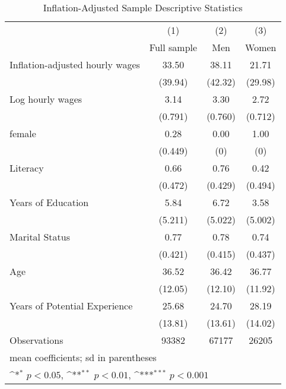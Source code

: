 \begin{table}[htbp]\centering
\def\sym#1{\ifmmode^{#1}\else\(^{#1}\)\fi}
\caption{Inflation-Adjusted Sample Descriptive Statistics}
\begin{tabular}{l*{3}{c}}
\hline\hline
                    &\multicolumn{1}{c}{(1)}&\multicolumn{1}{c}{(2)}&\multicolumn{1}{c}{(3)}\\
                    &\multicolumn{1}{c}{Full sample}&\multicolumn{1}{c}{Men}&\multicolumn{1}{c}{Women}\\
\hline
Inflation-adjusted hourly wages&       33.50         &       38.11         &       21.71         \\
                    &     (39.94)         &     (42.32)         &     (29.98)         \\
[1em]
Log hourly wages    &        3.14         &        3.30         &        2.72         \\
                    &     (0.791)         &     (0.760)         &     (0.712)         \\
[1em]
female              &        0.28         &        0.00         &        1.00         \\
                    &     (0.449)         &         (0)         &         (0)         \\
[1em]
Literacy            &        0.66         &        0.76         &        0.42         \\
                    &     (0.472)         &     (0.429)         &     (0.494)         \\
[1em]
Years of Education  &        5.84         &        6.72         &        3.58         \\
                    &     (5.211)         &     (5.022)         &     (5.002)         \\
[1em]
Marital Status      &        0.77         &        0.78         &        0.74         \\
                    &     (0.421)         &     (0.415)         &     (0.437)         \\
[1em]
Age                 &       36.52         &       36.42         &       36.77         \\
                    &     (12.05)         &     (12.10)         &     (11.92)         \\
[1em]
Years of Potential Experience&       25.68         &       24.70         &       28.19         \\
                    &     (13.81)         &     (13.61)         &     (14.02)         \\
\hline
Observations        &       93382         &       67177         &       26205         \\
\hline\hline
\multicolumn{4}{l}{\footnotesize mean coefficients; sd in parentheses}\\
\multicolumn{4}{l}{\footnotesize \sym{*} \(p<0.05\), \sym{**} \(p<0.01\), \sym{***} \(p<0.001\)}\\
\end{tabular}
\end{table}
